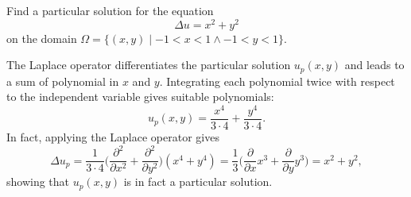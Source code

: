 Find a particular solution for the equation
\[
\Delta u = x^2 + y^2
\]
on the domain $\Omega = \{(x,y)\mid -1<x<1\wedge -1< y< 1\}$.

\begin{loesung}
The Laplace operator differentiates the particular solution $u_p(x,y)$
and leads to a sum of polynomial in $x$ and $y$.
Integrating each polynomial twice with respect to the independent
variable gives suitable polynomials:
\[
u_p(x,y)
=
\frac{x^4}{3\cdot 4}
+
\frac{y^4}{3\cdot 4}.
\]
In fact, applying the Laplace operator gives
\[
\Delta u_p
=
\frac{1}{3\cdot 4}
\biggl(
\frac{\partial^2}{\partial x^2}
+
\frac{\partial^2}{\partial y^2}
\biggr)
(x^4+y^4)
=
\frac{1}{3}
\biggl(
\frac{\partial}{\partial x}
x^3
+
\frac{\partial}{\partial y}
y^3
\biggr)
=
x^2+y^2,
\]
showing that $u_p(x,y)$ is in fact a particular solution.
\end{loesung}


